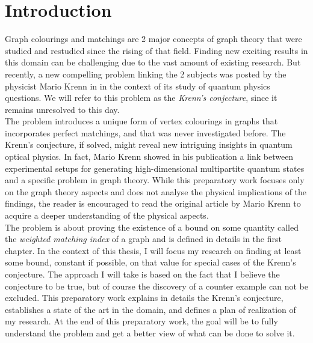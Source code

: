 \setcounter{secnumdepth}{-1}

\chapter{Introduction}

Graph colourings and matchings are 2 major concepts of graph theory that were studied and restudied since the rising of that field. Finding new exciting results in this domain can be challenging due to the vast amount of existing research. But recently, a new compelling problem linking the 2 subjects was posted by the physicist Mario Krenn in \cite{wordpress} in the context of its study of quantum physics questions. We will refer to this problem as the \textit{Krenn's conjecture}, since it remains unresolved to this day.\\

The problem introduces a unique form of vertex colourings in graphs that incorporates perfect matchings, and that was never investigated before. The Krenn's conjecture, if solved, might reveal new intriguing insights in quantum optical physics. In fact, Mario Krenn showed in his publication \cite{Krenn_2017} a link between experimental setups for generating high-dimensional multipartite quantum states and a specific problem in graph theory. While this preparatory work focuses only on the graph theory aspects and does not analyse the physical implications of the findings, the reader is encouraged to read the original article by Mario Krenn to acquire a deeper understanding of the physical aspects. \\

The problem is about proving the existence of a bound on some quantity called the \textit{weighted matching index} of a graph and is defined in details in the first chapter. In the context of this thesis, I will focus my research on finding at least some bound, constant if possible, on that value for special cases of the Krenn's conjecture. The approach I will take is based on the fact that I believe the conjecture to be true, but of course the discovery of a counter example can not be excluded. This preparatory work explains in details the Krenn's conjecture, establishes a state of the art in the domain, and defines a plan of realization of my research. At the end of this preparatory work, the goal will be to fully understand the problem and get a better view of what can be done to solve it.